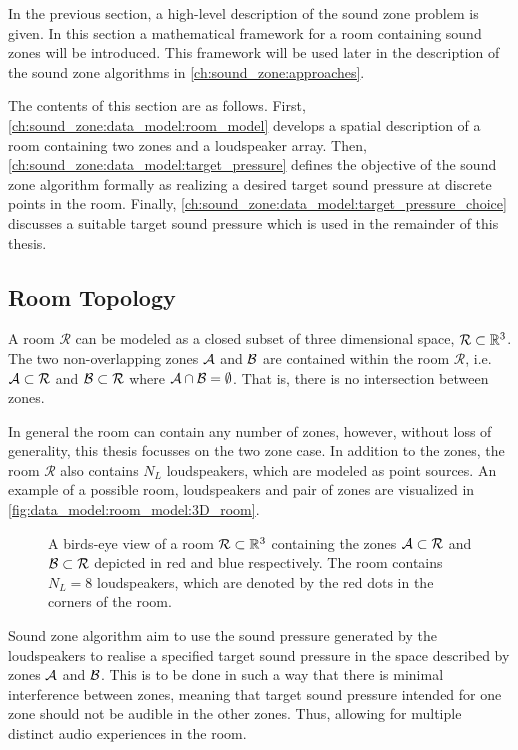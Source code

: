 In the previous section, a high-level description of the sound zone problem is given.
In this section a mathematical framework for a room containing sound zones will be introduced.
This framework will be used later in the description of the sound zone algorithms in \autoref{ch:sound_zone:approaches}.

The contents of this section are as follows.
First, \autoref{ch:sound_zone:data_model:room_model} develops a spatial description of a room containing
two zones and a loudspeaker array.
Then, \autoref{ch:sound_zone:data_model:target_pressure} defines the objective of the sound zone algorithm formally
as realizing a desired target sound pressure at discrete points in the room.
Finally, \autoref{ch:sound_zone:data_model:target_pressure_choice} discusses a suitable target
sound pressure which is used in the remainder of this thesis.

\subsection{Room Topology}
\label{ch:sound_zone:data_model:room_model}
A room $\mathcal{R}$ can be modeled as a closed subset of three dimensional space, $\mathcal{R} \subset \mathbb{R}^{3}$.
The two non-overlapping zones $\mathcal{A}$ and $\mathcal{B}$ are contained within the room $\mathcal{R}$, 
i.e. $\mathcal{A} \subset \mathcal{R}$ and $\mathcal{B} \subset \mathcal{R}$ where $\mathcal{A} \cap \mathcal{B} = \emptyset$.
That is, there is no intersection between zones.

In general the room can contain any number of zones, however, without loss of generality, 
this thesis focusses on the two zone case. 
In addition to the zones, the room $\mathcal{R}$ also contains $N_L$ loudspeakers, which are modeled as point sources.
An example of a possible room, loudspeakers and pair of zones are visualized in \autoref{fig:data_model:room_model:3D_room}.

\begin{figure}
    \centering
    
    \caption{A birds-eye view of a room $\mathcal{R}\subset \mathbb{R}^{3}$ containing the zones $\mathcal{A}\subset\mathcal{R}$ 
    and $\mathcal{B}\subset\mathcal{R}$ depicted in red and blue respectively. 
    The room contains $N_L = 8$ loudspeakers, which are denoted by the red dots in the corners of the room.}
    \label{fig:data_model:room_model:3D_room}
\end{figure}

Sound zone algorithm aim to use the sound pressure generated by the loudspeakers to realise a specified target sound pressure
in the space described by zones $\mathcal{A}$ and $\mathcal{B}$.
This is to be done in such a way that there is minimal interference between zones, 
meaning that target sound pressure intended for one zone should not be audible in the other zones.
Thus, allowing for multiple distinct audio experiences in the room.

